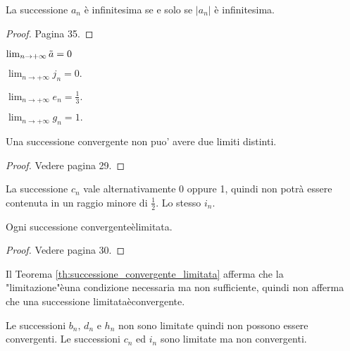 \begin{proposition}
    La successione $a_n$ è infinitesima se e solo se $|a_n|$ è infinitesima.
\end{proposition}
\begin{proof}
    Pagina 35.
\end{proof}

\begin{example}       $\lim_{n\rightarrow+\infty}\Tilde{a} = 0$
\end{example}

\begin{example}
    $\lim_{n\rightarrow+\infty}j_n = 0.$
\end{example}

\begin{example}
    $\lim_{n\rightarrow+\infty}e_n = \frac{1}{3}.$
\end{example}

\begin{example}
    $\lim_{n\rightarrow+\infty}g_n = 1.$
\end{example}

\begin{theorem}
    Una successione convergente non puo' avere due limiti distinti.
\end{theorem}
\begin{proof}
    Vedere pagina 29.
\end{proof}

\begin{example}
    La successione $c_n$ vale alternativamente 0 oppure 1, quindi non potrà essere contenuta in un raggio minore di $\frac{1}{2}$. Lo stesso $i_n$.
\end{example}

\begin{theorem}\label{th:successione_convergente_limitata}
    Ogni successione convergenteèlimitata.
\end{theorem}
\begin{proof}
    Vedere pagina 30.
\end{proof}

\begin{remark}
    Il Teorema \ref{th:successione_convergente_limitata} afferma che la "limitazione"èuna condizione necessaria ma non sufficiente, quindi non afferma che una successione limitataèconvergente.
\end{remark}

\begin{example}
    Le successioni $b_n,\, d_n$ e $h_n$ non sono limitate quindi non possono essere convergenti. Le successioni $c_n$ ed $i_n$ sono limitate ma non convergenti.
\end{example}


